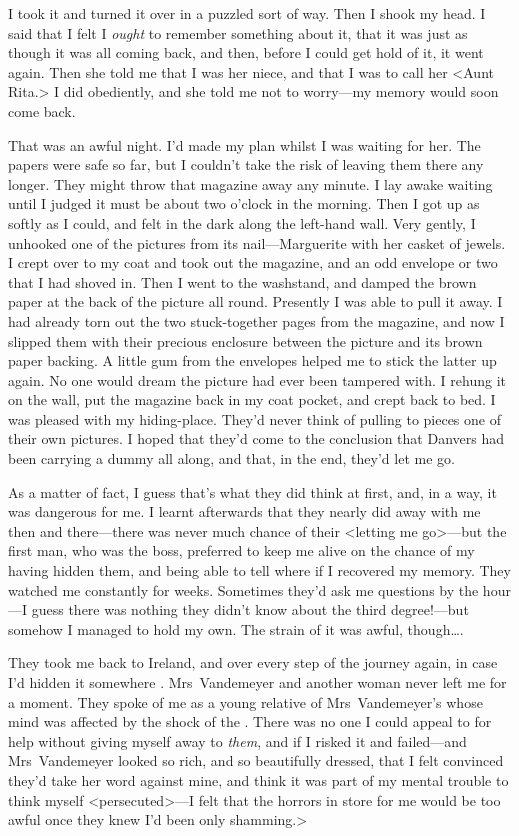 I took it and turned it over in a puzzled sort of way. Then I shook my head. I said that I felt I \emph{ought} to remember something about it, that it was just as though it was all coming back, and then, before I could get hold of it, it went again. Then she told me that I was her niece, and that I was to call her <Aunt Rita.> I did obediently, and she told me not to worry—my memory would soon come back.

That was an awful night. I'd made my plan whilst I was waiting for her. The papers were safe so far, but I couldn't take the risk of leaving them there any longer. They might throw that magazine away any minute. I lay awake waiting until I judged it must be about two o'clock in the morning. Then I got up as softly as I could, and felt in the dark along the left-hand wall. Very gently, I unhooked one of the pictures from its nail—Marguerite with her casket of jewels. I crept over to my coat and took out the magazine, and an odd envelope or two that I had shoved in. Then I went to the washstand, and damped the brown paper at the back of the picture all round. Presently I was able to pull it away. I had already torn out the two stuck-together pages from the magazine, and now I slipped them with their precious enclosure between the picture and its brown paper backing. A little gum from the envelopes helped me to stick the latter up again. No one would dream the picture had ever been tampered with. I rehung it on the wall, put the magazine back in my coat pocket, and crept back to bed. I was pleased with my hiding-place. They'd never think of pulling to pieces one of their own pictures. I hoped that they'd come to the conclusion that Danvers had been carrying a dummy all along, and that, in the end, they'd let me go.

As a matter of fact, I guess that's what they did think at first, and, in a way, it was dangerous for me. I learnt afterwards that they nearly did away with me then and there—there was never much chance of their <letting me go>—but the first man, who was the boss, preferred to keep me alive on the chance of my having hidden them, and being able to tell where if I recovered my memory. They watched me constantly for weeks. Sometimes they'd ask me questions by the hour—I guess there was nothing they didn't know about the third degree!—but somehow I managed to hold my own. The strain of it was awful, though\dots.

They took me back to Ireland, and over every step of the journey again, in case I'd hidden it somewhere . Mrs~Vandemeyer and another woman never left me for a moment. They spoke of me as a young relative of Mrs~Vandemeyer's whose mind was affected by the shock of the . There was no one I could appeal to for help without giving myself away to \emph{them}, and if I risked it and failed—and Mrs~Vandemeyer looked so rich, and so beautifully dressed, that I felt convinced they'd take her word against mine, and think it was part of my mental trouble to think myself <persecuted>—I felt that the horrors in store for me would be too awful once they knew I'd been only shamming.>

